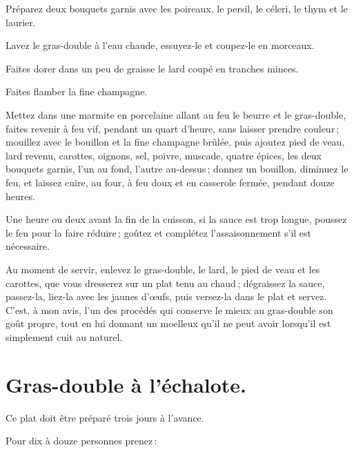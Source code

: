 Préparez deux bouquets garnis avec les poireaux, le persil, le céleri, le thym
et le laurier.

Lavez le gras-double à l'eau chaude, essuyez-le et coupez-le en morceaux.

Faites dorer dans un peu de graisse le lard coupé en tranches minces.

Faites flamber la fine champagne.

Mettez dans une marmite en porcelaine allant au feu le beurre et le
gras-double, faites revenir à feu vif, pendant un quart d'heure, sans laisser
prendre couleur ; mouillez avec le bouillon et la fine champagne brûlée, puis
ajoutez pied de veau, lard revenu, carottes, oignons, sel, poivre, muscade,
quatre épices, les deux bouquets garnis, l’un au fond, l'autre au-dessus ;
donnez un bouillon, diminuez le feu, et laissez cuire, au four, à feu doux et
en casserole fermée, pendant douze heures.

Une heure ou deux avant la fin de la cuisson, si la sauce est trop longue,
poussez le feu pour la faire réduire ; goûtez et complétez l'assaisonnement
s'il est nécessaire.

Au moment de servir, enlevez le gras-double, le lard, le pied de veau et les
carottes, que vous dresserez sur un plat tenu au chaud ; dégraissez la sauce,
passez-la, liez-la avec les jaunes d'œufs, puis versez-la dans le plat et
servez. C'est, à mon avis, l’un des procédés qui conserve le mieux au
gras-double son goût propre, tout en lui donnant un moelleux qu'il ne peut
avoir lorsqu'il est simplement cuit au naturel.

\section*{\centering Gras-double à l'échalote.}

Ce plat doit être préparé trois jours à l'avance.

\medskip

Pour dix à douze personnes prenez :

\medskip

